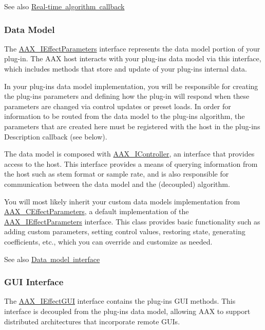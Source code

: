 \begin{DoxySeeAlso}{See also}
\mbox{\hyperlink{a00797}{Real-\/time algorithm callback}}
\end{DoxySeeAlso}
\hypertarget{a00794_subsection__data_model}{}\subsubsection{Data Model}\label{a00794_subsection__data_model}
The \mbox{\hyperlink{a01825}{A\+A\+X\+\_\+\+I\+Effect\+Parameters}} interface represents the data model portion of your plug-\/in. The A\+AX host interacts with your plug-\/in\textquotesingle{}s data model via this interface, which includes methods that store and update of your plug-\/in\textquotesingle{}s internal data.

In your plug-\/in\textquotesingle{}s data model implementation, you will be responsible for creating the plug-\/in\textquotesingle{}s parameters and defining how the plug-\/in will respond when these parameters are changed via control updates or preset loads. In order for information to be routed from the data model to the plug-\/in\textquotesingle{}s algorithm, the parameters that are created here must be registered with the host in the plug-\/in\textquotesingle{}s Description callback (see below).

The data model is composed with \mbox{\hyperlink{a01789}{A\+A\+X\+\_\+\+I\+Controller}}, an interface that provides access to the host. This interface provides a means of querying information from the host such as stem format or sample rate, and is also responsible for communication between the data model and the (decoupled) algorithm.

You will most likely inherit your custom data model\textquotesingle{}s implementation from \mbox{\hyperlink{a01481}{A\+A\+X\+\_\+\+C\+Effect\+Parameters}}, a default implementation of the \mbox{\hyperlink{a01825}{A\+A\+X\+\_\+\+I\+Effect\+Parameters}} interface. This class provides basic functionality such as adding custom parameters, setting control values, restoring state, generating coefficients, etc., which you can override and customize as needed.

 \begin{DoxySeeAlso}{See also}
\mbox{\hyperlink{a00798}{Data model interface}}
\end{DoxySeeAlso}
\hypertarget{a00794_subsection__gui_interface}{}\subsubsection{G\+U\+I Interface}\label{a00794_subsection__gui_interface}
The \mbox{\hyperlink{a01821}{A\+A\+X\+\_\+\+I\+Effect\+G\+UI}} interface contains the plug-\/in\textquotesingle{}s G\+UI methods. This interface is decoupled from the plug-\/in\textquotesingle{}s data model, allowing A\+AX to support distributed architectures that incorporate remote G\+U\+Is.

